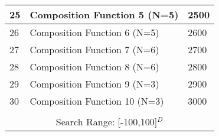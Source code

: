\begin{table}[!htbp]
\begin{tabular}{|p{0.5cm}|p{5.4cm}|p{0.6cm}|}
25 & Composition Function 5 (N=5) & 2500\\
\hline
26 & Composition Function 6 (N=5) & 2600\\
\hline
27 & Composition Function 7 (N=6) & 2700\\
\hline
28 & Composition Function 8 (N=6) & 2800 \\
\hline
29 & Composition Function 9 (N=3) & 2900 \\
\hline
30 & Composition Function 10 (N=3) & 3000 \\
\hline
\multicolumn{3}{|c|}{ } \\[0.05ex]
\multicolumn{3}{|c|}{Search Range: [-100,100]$^{D}$ } \\
\hline
\end{tabular}
\vspace{-5mm}
\end{table}

